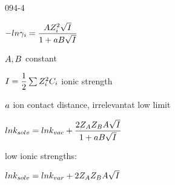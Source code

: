 \begin{mitframe}{094-4}
 \begin{listone}
	\item $-ln\actcoeff=\dfrac{\helmholtz\compress_{\state}^2\sqrt{\mominertia}}{1+\activity\exergy\sqrt{\mominertia}}$
    	\begin{listtwo}
        	\item $\helmholtz,\exergy$ constant
            \item $\mominertia=\dfrac{1}{2}\sum\nolimits\compress_{\state}^2\conc_{\state}$ ionic strength
            \item $\activity$ ion contact distance, irrelevantat low limit
            \end{listtwo}
	\item $ln\thermcond_{solv}=ln\thermcond_{vac}+\dfrac{2\compress_{\helmholtz}\compress_{\exergy}\helmholtz\sqrt{\mominertia}}{1+\activity\exergy\sqrt{\mominertia}}$
    	\begin{listtwo}
        		\item low ionic strengths:
                	\begin{listthree}
                    	\item $ln\thermcond_{solv}=ln\thermcond_{var}+2\compress_{\helmholtz}\compress_{\exergy}\helmholtz\sqrt{\mominertia}$
                    \end{listthree}
        \end{listtwo}
\end{listone}   
\end{mitframe}